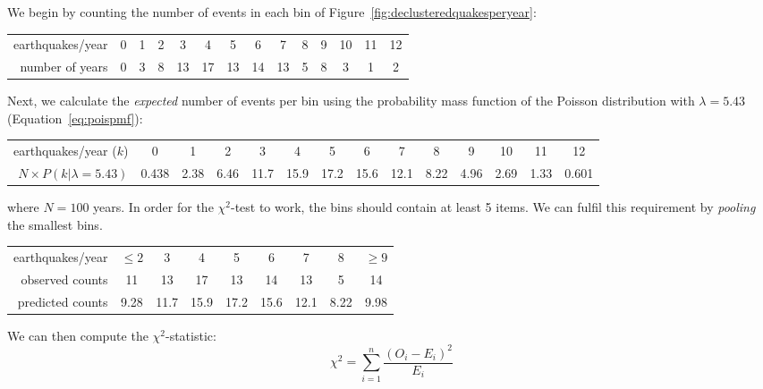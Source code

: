 We begin by counting the number of events in each bin of
Figure~\ref{fig:declusteredquakesperyear}:

\begin{center}
  \begin{tabular}{r|c@{\gap}c@{\gap}c@{\gap}c@{\gap}c@{\gap}
      c@{\gap}c@{\gap}c@{\gap}c@{\gap}c@{\gap}c@{\gap}c@{\gap}c}
    earthquakes/year &
    0 & 1 & 2 & 3 & 4 & 5 & 6 & 7 & 8 & 9 & 10 & 11 & 12 \\
    number of years &
    0 & 3 & 8 & 13 & 17 & 13 & 14 & 13 & 5 & 8 & 3 & 1 & 2 
  \end{tabular}
\end{center}

Next, we calculate the \textit{expected} number of events per bin
using the probability mass function of the Poisson distribution with
$\lambda=5.43$ (Equation~\ref{eq:poispmf}):

\begin{center}
  \begin{tabular}{r|c@{\gap}c@{\gap}c@{\gap}c@{\gap}c@{\gap}
      c@{\gap}c@{\gap}c@{\gap}c@{\gap}c@{\gap}c@{\gap}c@{\gap}c}
    earthquakes/year ($k$) &
    0 & 1 & 2 & 3 & 4 & 5 & 6 & 7 & 8 & 9 & 10 & 11 & 12 \\
    $N\times{P}(k|\lambda=5.43)$ &
    0.438 & 2.38 & 6.46 & 11.7 & 15.9 & 17.2 & 15.6 & 12.1 &
    8.22 & 4.96 & 2.69 & 1.33 & 0.601
  \end{tabular}
\end{center}

\noindent where $N=100$ years. In order for the $\chi^2$-test to work,
the bins should contain at least 5 items. We can fulfil this
requirement by \emph{pooling} the smallest bins.

\begin{center}
  \begin{tabular}{r|c@{\gap}c@{\gap}c@{\gap}
      c@{\gap}c@{\gap}c@{\gap}c@{\gap}c}
    earthquakes/year &
    $\leq{2}$ & 3 & 4 & 5 & 6 & 7 & 8 & $\geq{9}$ \\
    observed counts &
    11 & 13 & 17 & 13 & 14 & 13 & 5 & 14 \\
    predicted counts & 9.28 & 11.7 &
    15.9 & 17.2 & 15.6 & 12.1 & 8.22 & 9.98
  \end{tabular}
\end{center}

We can then compute the $\chi^2$-statistic:
\begin{equation}
  \chi^2 = \sum\limits_{i=1}^{n} \frac{(O_i-E_i)^2}{E_i}
  \label{eq:chi2}
\end{equation}

